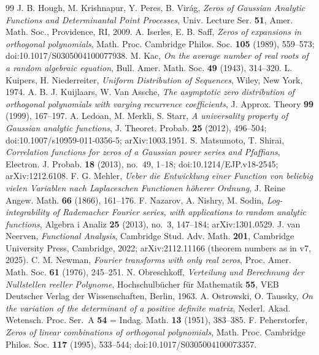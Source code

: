\documentclass[11pt]{amsart}
\theoremstyle{definition}
\theoremstyle{remark}
\numberwithin{equation}{section}
\begin{document}
\begin{thebibliography}{99}
 J. B. Hough, M. Krishnapur, Y. Peres, B. Vir\'ag, \emph{Zeros of Gaussian Analytic Functions and Determinantal Point Processes}, Univ. Lecture Ser. \textbf{51}, Amer. Math. Soc., Providence, RI, 2009.
 A. Iserles, E. B. Saff, \emph{Zeros of expansions in orthogonal polynomials}, Math. Proc. Cambridge Philos. Soc. \textbf{105} (1989), 559--573; doi:10.1017/S0305004100077938.
 M. Kac, \emph{On the average number of real roots of a random algebraic equation}, Bull. Amer. Math. Soc. \textbf{49} (1943), 314--320.
 L. Kuipers, H. Niederreiter, \emph{Uniform Distribution of Sequences}, Wiley, New York, 1974.
 A. B. J. Kuijlaars, W. Van Assche, \emph{The asymptotic zero distribution of orthogonal polynomials with varying recurrence coefficients}, J. Approx. Theory \textbf{99} (1999), 167--197.
 A. Ledoan, M. Merkli, S. Starr, \emph{A universality property of Gaussian analytic functions}, J. Theoret. Probab. \textbf{25} (2012), 496--504; doi:10.1007/s10959-011-0356-5; arXiv:1003.1951.
 S. Matsumoto, T. Shirai, \emph{Correlation functions for zeros of a Gaussian power series and Pfaffians}, Electron. J. Probab. \textbf{18} (2013), no.~49, 1--18; doi:10.1214/EJP.v18-2545; arXiv:1212.6108.
 F. G. Mehler, \emph{Ueber die Entwicklung einer Function von beliebig vielen Variablen nach Laplaceschen Functionen h\"oherer Ordnung}, J. Reine Angew. Math. \textbf{66} (1866), 161--176.
 F. Nazarov, A. Nishry, M. Sodin, \emph{Log-integrability of Rademacher Fourier series, with applications to random analytic functions}, Algebra i Analiz \textbf{25} (2013), no.~3, 147--184; arXiv:1301.0529.
 J. van Neerven, \emph{Functional Analysis}, Cambridge Stud. Adv. Math. \textbf{201}, Cambridge University Press, Cambridge, 2022; arXiv:2112.11166 (theorem numbers as in v7, 2025).
 C. M. Newman, \emph{Fourier transforms with only real zeros}, Proc. Amer. Math. Soc. \textbf{61} (1976), 245--251.
 N. Obreschkoff, \emph{Verteilung und Berechnung der Nullstellen reeller Polynome}, Hochschulb\"ucher f\"ur Mathematik \textbf{55}, VEB Deutscher Verlag der Wissenschaften, Berlin, 1963.
 A. Ostrowski, O. Taussky, \emph{On the variation of the determinant of a positive definite matrix}, Nederl. Akad. Wetensch. Proc. Ser.~A \textbf{54} = Indag. Math. \textbf{13} (1951), 383--385.
 F. Peherstorfer, \emph{Zeros of linear combinations of orthogonal polynomials}, Math. Proc. Cambridge Philos. Soc. \textbf{117} (1995), 533--544; doi:10.1017/S0305004100073357.

\end{thebibliography}
\end{document}
